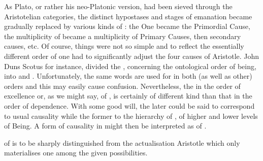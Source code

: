 \pa\label{pa:foundingCausing} As Plato, or rather
his neo-Platonic version, had been sieved through the Aristotelian categories, the
distinct hypostases and stages of emanation became gradually replaced by various
kinds of : the One became the Primordial Cause, the multiplicity of
 became a multiplicity of Primary Causes, then secondary causes,
etc. Of course, things were not so simple and to reflect the essentially
different order of  one had to significantly adjust the four causes
of Aristotle.  John Duns Scotus for instance, divided the ,
concerning the ontological order of being, into  and
.
Unfortunately, the same words are used for  in both (as
well as other) orders and this may easily cause confusion. Nevertheless, the
 in the order of excellence or, as we might say, of
, is certainly of different kind than that in the order of
dependence.  With some good will, the later could be said to correspond to usual
causality while the former to the hierarchy of , of higher and
lower levels of Being.  A form of causality in  might then
be interpreted as  of .
%

\pa\label{pa:contActVirt}  of  is to be sharply
distinguished from the actualisation  Aristotle which only
materialises one among the given possibilities.

